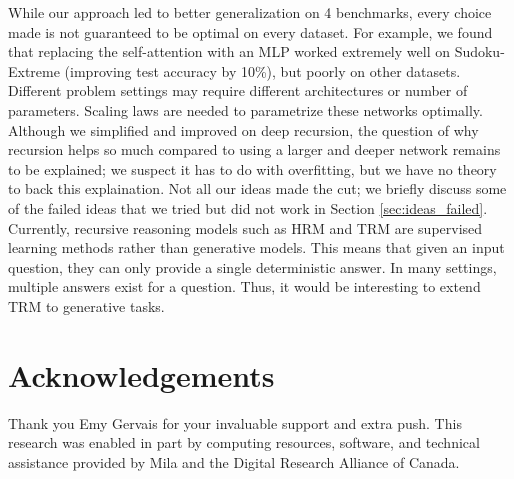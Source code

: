 \documentclass{article}
\theoremstyle{plain}
\theoremstyle{definition}
\theoremstyle{remark}
\begin{document}
While our approach led to better generalization on 4 benchmarks, every choice made is not guaranteed to be optimal on every dataset. For example, we found that replacing the self-attention with an MLP worked extremely well on Sudoku-Extreme (improving test accuracy by 10\%), but poorly on other datasets. Different problem settings may require different architectures or number of parameters. Scaling laws are needed to parametrize these networks optimally. Although we simplified and improved on deep recursion, the question of why recursion helps so much compared to using a larger and deeper network remains to be explained; we suspect it has to do with overfitting, but we have no theory to back this explaination. Not all our ideas made the cut; we briefly discuss some of the failed ideas that we tried but did not work in Section \ref{sec:ideas_failed}. Currently, recursive reasoning models such as HRM and TRM are supervised learning methods rather than generative models. This means that given an input question, they can only provide a single deterministic answer. In many settings, multiple answers exist for a question. Thus, it would be interesting to extend TRM to generative tasks.

\section*{Acknowledgements}

Thank you Emy Gervais for your invaluable support and extra push. This research was enabled in part by computing resources, software, and technical assistance provided by Mila and the Digital Research Alliance of Canada.






\newpage
\clearpage
\appendix
\end{document}
